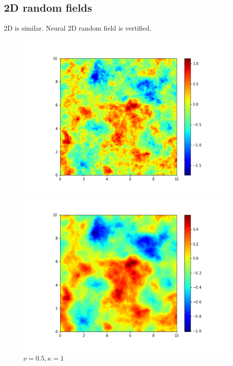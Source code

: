 \documentclass{article}
\begin{document}
\subsection{2D random fields}
2D is similar. Neural 2D random field is vertified.
\begin{figure}[H]
    \centering
\begin{minipage}[t]{0.3\textwidth}  %
    \centering
    \includegraphics[width=\textwidth]{./pics/2D_RF_256_10.0_0.5_1.png}  %
    \caption*{$\nu=0.5, \kappa=1$}
  \end{minipage}
  \begin{minipage}[t]{0.3\textwidth} 
    \centering
    \includegraphics[width=\textwidth]{./pics/2D_RF_256_10.0_1_1.png} 

\end{minipage}
\end{figure}
\end{document}
